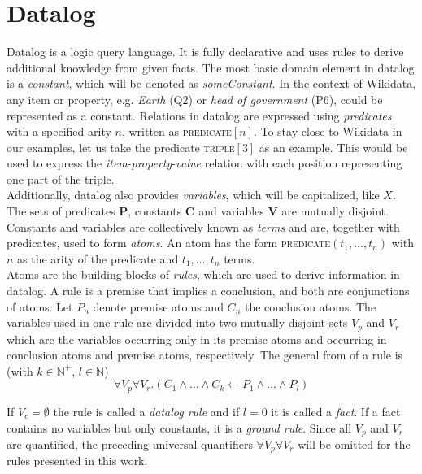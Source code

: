 \documentclass[hyperref,bachelorofscience,fleqn]{cgvpub}
\begin{document}
\section{Datalog}
Datalog is a logic query language. It is fully declarative and uses rules to derive additional knowledge from given facts. The most basic domain element in datalog is a \emph{constant}, which will be denoted as \emph{someConstant}. In the context of Wikidata, any item or property, e.g. \emph{Earth} (Q2) or \emph{head of government} (P6), could be represented as a constant. Relations in datalog are expressed using \emph{predicates} with a specified arity \(n\), written as \textsc{predicate}\([n]\). To stay close to Wikidata in our examples, let us take the predicate \textsc{triple}\([3]\) as an example. This would be used to express the \emph{item}-\emph{property}-\emph{value} relation with each position representing one part of the triple.\\
Additionally, datalog also provides \emph{variables}, which will be capitalized, like \(X\). The sets of predicates {\bf P}, constants {\bf C} and variables {\bf V} are mutually disjoint. Constants and variables are collectively known as \emph{terms} and are, together with predicates, used to form \emph{atoms}. An atom has the form \textsc{predicate}\((t_1, \ldots , t_n)\) with \(n\) as the arity of the predicate and \(t_1,\ldots,t_n\) terms.\\
Atoms are the building blocks of \emph{rules}, which are used to derive information in datalog. A rule is a premise that implies a conclusion, and both are conjunctions of atoms.
Let \(P_n\) denote  premise atoms and \(C_n\) the conclusion atoms. The variables used in one rule are divided into two mutually disjoint sets \(V_p\) and \(V_r\) which are the variables occurring only in its premise atoms and occurring in conclusion atoms and premise atoms, respectively. The general from of a rule is (with \(k \in \mathbb{N}^+\), \(l \in \mathbb{N}\))
\begin{equation}
\forall V_p \forall V_r.(C_1 \wedge \ldots \wedge C_k \leftarrow P_1 \wedge \ldots \wedge P_l)
\end{equation}

If \(V_c = \emptyset\) the rule is called a \emph{datalog rule} and if \(l = 0\) it is called a \emph{fact}. If a fact contains no variables but only constants, it is a \emph{ground rule}. Since all \(V_p\) and \(V_r\) are  quantified, the preceding universal quantifiers \(\forall V_p \forall V_r\) will be omitted for the rules presented in this work.
\end{document}
